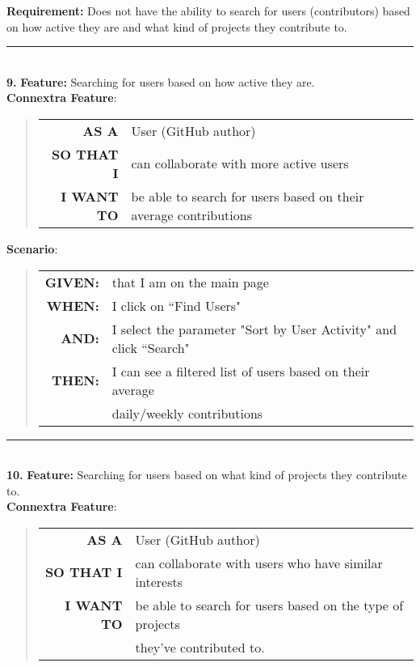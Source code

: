 \documentclass[12pt]{article}
\newcommand{\Requirement}[1] {
   \noindent \textbf{Requirement:} #1
}
\newcommand{\Feature}[1]{ 
   \noindent \textbf{Feature:} #1
}
\newcommand{\GivenSc} {
	\noindent \textbf{GIVEN:}
	}
\newcommand{\WhenSc} {
	\noindent \textbf{WHEN:}
	}
\newcommand{\AndSc} {
	\noindent \textbf{AND:}
	}
\newcommand{\ThenSc} {
	\noindent \textbf{THEN:}
	}
\begin{document}
\pagebreak
\begin{framed}

\Requirement{Does not have the ability to search for users (contributors) based on how active they
are and what kind of projects they contribute to.}\\[0.2cm]

\hrule~\\

\noindent\textbf{9.}\Feature{Searching for users based on how active they are.}\\[0.2cm]

\noindent \textbf{Connextra Feature}:
\begin{quote}
\begin{tabular}{rl}
\textbf{AS A}      & User (\textsf{GitHub} author)\\
\textbf{SO THAT I} & can collaborate with more active users\\
\textbf{I WANT TO} & be able to search for users based on their average contributions
\end{tabular}
\end{quote}

\noindent \textbf{Scenario}:
\begin{quote}
\begin{tabular}{rl}
\GivenSc & that I am on the main page\\
\WhenSc  & I click on ``Find Users"\\
\AndSc   & I select the parameter "Sort by User Activity" and click ``Search"\\
\ThenSc  & I can see a filtered list of users based on their average \\ 
         & daily/weekly contributions 
\end{tabular}
\end{quote}

\hrule~\\

\noindent\textbf{10.}\Feature{Searching for users based on what kind of projects they contribute to.}\\[0.2cm]

\noindent \textbf{Connextra Feature}:
\begin{quote}
\begin{tabular}{rl}
\textbf{AS A}      & User (\textsf{GitHub} author)\\
\textbf{SO THAT I} & can collaborate with users who have similar interests\\
\textbf{I WANT TO} & be able to search for users based on the type of projects \\
                   & they've contributed to.
\end{tabular}
\end{quote}


\end{framed}
\end{document}
